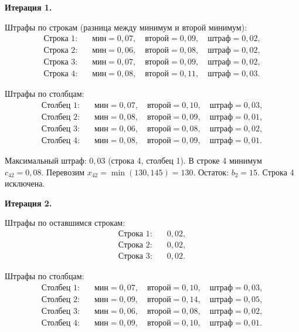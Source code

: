 \documentclass[a4paper, final]{article}
\begin{document}
\textbf{Итерация 1.}

Штрафы по строкам (разница между минимум и второй минимум):
\begin{align*}
\text{Строка 1:} \quad &\text{мин} = 0{,}07, \quad \text{второй} = 0{,}09, \quad \text{штраф} = 0{,}02,\\
\text{Строка 2:} \quad &\text{мин} = 0{,}06, \quad \text{второй} = 0{,}08, \quad \text{штраф} = 0{,}02,\\
\text{Строка 3:} \quad &\text{мин} = 0{,}07, \quad \text{второй} = 0{,}09, \quad \text{штраф} = 0{,}02,\\
\text{Строка 4:} \quad &\text{мин} = 0{,}08, \quad \text{второй} = 0{,}11, \quad \text{штраф} = 0{,}03.
\end{align*}

Штрафы по столбцам:
\begin{align*}
\text{Столбец 1:} \quad &\text{мин} = 0{,}07, \quad \text{второй} = 0{,}10, \quad \text{штраф} = 0{,}03,\\
\text{Столбец 2:} \quad &\text{мин} = 0{,}08, \quad \text{второй} = 0{,}09, \quad \text{штраф} = 0{,}01,\\
\text{Столбец 3:} \quad &\text{мин} = 0{,}06, \quad \text{второй} = 0{,}08, \quad \text{штраф} = 0{,}02,\\
\text{Столбец 4:} \quad &\text{мин} = 0{,}08, \quad \text{второй} = 0{,}09, \quad \text{штраф} = 0{,}01.
\end{align*}

Максимальный штраф: $0{,}03$ (строка 4, столбец 1). В строке 4 минимум $c_{42} = 0{,}08$.
Перевозим $x_{42} = \min(130, 145) = 130$. Остаток: $b_2 = 15$. Строка 4 исключена.

\textbf{Итерация 2.}

Штрафы по оставшимся строкам:
\begin{align*}
\text{Строка 1:} \quad &0{,}02,\\
\text{Строка 2:} \quad &0{,}02,\\
\text{Строка 3:} \quad &0{,}02.
\end{align*}

Штрафы по столбцам:
\begin{align*}
\text{Столбец 1:} \quad &\text{мин} = 0{,}07, \quad \text{второй} = 0{,}10, \quad \text{штраф} = 0{,}03,\\
\text{Столбец 2:} \quad &\text{мин} = 0{,}09, \quad \text{второй} = 0{,}14, \quad \text{штраф} = 0{,}05,\\
\text{Столбец 3:} \quad &\text{мин} = 0{,}06, \quad \text{второй} = 0{,}08, \quad \text{штраф} = 0{,}02,\\
\text{Столбец 4:} \quad &\text{мин} = 0{,}09, \quad \text{второй} = 0{,}10, \quad \text{штраф} = 0{,}01.
\end{align*}
\end{document}
